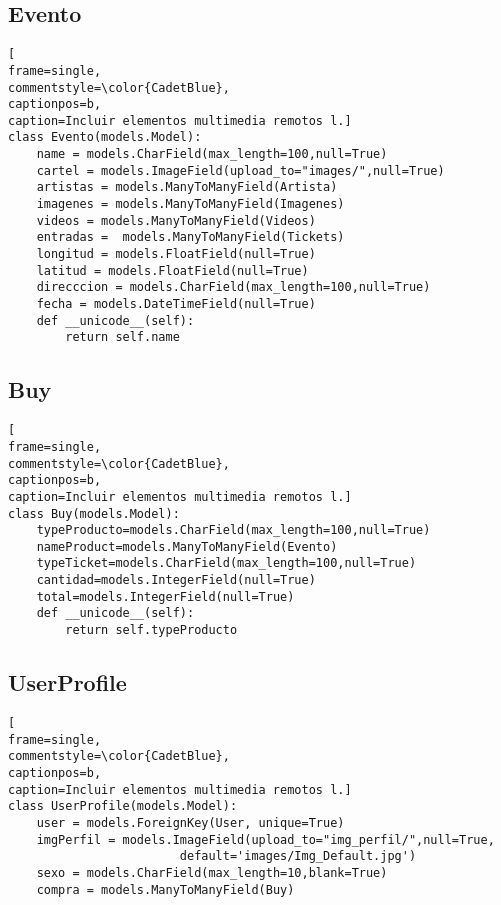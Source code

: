 \subsection{Evento}
\begin{lstlisting}[
frame=single,
commentstyle=\color{CadetBlue},
captionpos=b,
caption=Incluir elementos multimedia remotos l.]
class Evento(models.Model):
	name = models.CharField(max_length=100,null=True)
	cartel = models.ImageField(upload_to="images/",null=True)
	artistas = models.ManyToManyField(Artista)
	imagenes = models.ManyToManyField(Imagenes)
	videos = models.ManyToManyField(Videos)
	entradas =  models.ManyToManyField(Tickets)
	longitud = models.FloatField(null=True)
	latitud = models.FloatField(null=True)
	direcccion = models.CharField(max_length=100,null=True)
	fecha = models.DateTimeField(null=True)
	def __unicode__(self):
		return self.name
\end{lstlisting}

\subsection{Buy}
\begin{lstlisting}[
frame=single,
commentstyle=\color{CadetBlue},
captionpos=b,
caption=Incluir elementos multimedia remotos l.]
class Buy(models.Model):
	typeProducto=models.CharField(max_length=100,null=True) 
	nameProduct=models.ManyToManyField(Evento) 
	typeTicket=models.CharField(max_length=100,null=True) 
	cantidad=models.IntegerField(null=True)
	total=models.IntegerField(null=True)
	def __unicode__(self):
		return self.typeProducto
\end{lstlisting}

\subsection{UserProfile}
\begin{lstlisting}[
frame=single,
commentstyle=\color{CadetBlue},
captionpos=b,
caption=Incluir elementos multimedia remotos l.]
class UserProfile(models.Model):
	user = models.ForeignKey(User, unique=True)
	imgPerfil = models.ImageField(upload_to="img_perfil/",null=True,
    					default='images/Img_Default.jpg')
	sexo = models.CharField(max_length=10,blank=True)
	compra = models.ManyToManyField(Buy)
\end{lstlisting}

